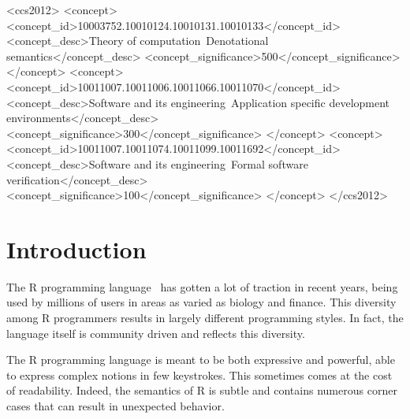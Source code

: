 \documentclass[
    sigplan,
    10pt,
    review, %
    natbib=false %
 ]{acmart}
\begin{document}
\begin{CCSXML}
  <ccs2012>
    <concept>
      <concept_id>10003752.10010124.10010131.10010133</concept_id>
      <concept_desc>Theory of computation~Denotational semantics</concept_desc>
      <concept_significance>500</concept_significance>
    </concept>
    <concept>
      <concept_id>10011007.10011006.10011066.10011070</concept_id>
      <concept_desc>Software and its engineering~Application specific development environments</concept_desc>
      <concept_significance>300</concept_significance>
    </concept>
    <concept>
      <concept_id>10011007.10011074.10011099.10011692</concept_id>
      <concept_desc>Software and its engineering~Formal software verification</concept_desc>
      <concept_significance>100</concept_significance>
    </concept>
  </ccs2012>
\end{CCSXML}



\maketitle

\section{Introduction}
\label{sec:intro}

The R programming language~\parencite{R, ihaka1996r, Rwebsite}
has gotten a lot of traction in recent years, being used by millions of users in areas as varied as biology and finance. This diversity among R programmers results in largely different programming styles. In fact, the language itself is community driven and reflects this diversity.

The R programming language is meant to be both expressive and powerful,
able to express complex notions in few keystrokes.
This sometimes comes at the cost of readability. Indeed, 
the semantics of R is subtle and contains numerous corner cases that can result in unexpected behavior. 
\end{document}
